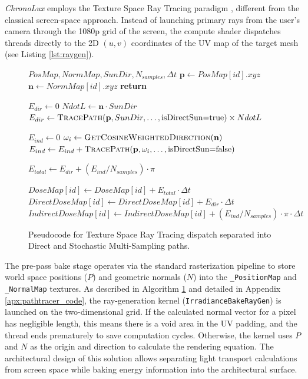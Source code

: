 \textit{ChronoLux} employs the Texture Space Ray Tracing paradigm \cite{hasselgren2016texture}, different from the classical screen-space approach. Instead of launching primary rays from the user’s camera through the 1080p grid of the screen, the compute shader dispatches threads directly to the 2D $(u, v)$ coordinates of the UV map of the target mesh (see Listing \ref{lst:raygen}).

\begin{figure}[H]
    \begin{algorithmic}
        \Require $PosMap, NormMap, SunDir, N_{samples}, \Delta t$
        \State $\mathbf{p} \leftarrow PosMap[id].xyz$
        \State $\mathbf{n} \leftarrow NormMap[id].xyz$
        \State \textbf{return} \quad {}
        \EndIf

        \State $E_{dir} \leftarrow 0$
        \State $NdotL \leftarrow \mathbf{n} \cdot SunDir$
        \State $E_{dir} \leftarrow \textsc{TracePath}(\mathbf{p}, SunDir, \dots, \text{isDirectSun=true}) \times NdotL$
        \EndIf

        \State $E_{ind} \leftarrow 0$
        \State $\omega_i \leftarrow \textsc{GetCosineWeightedDirection}(\mathbf{n})$
        \State $E_{ind} \leftarrow E_{ind} + \textsc{TracePath}(\mathbf{p}, \omega_i, \dots, \text{isDirectSun=false})$
        \EndFor

        \State $E_{total} \leftarrow E_{dir} + (E_{ind} / N_{samples}) \cdot \pi$

        \State $DoseMap[id] \leftarrow DoseMap[id] + E_{total} \cdot \Delta t$
        \State $DirectDoseMap[id] \leftarrow DirectDoseMap[id] + E_{dir} \cdot \Delta t$
        \State $IndirectDoseMap[id] \leftarrow IndirectDoseMap[id] + (E_{ind} / N_{samples}) \cdot \pi \cdot \Delta t$
        \EndFor
    \end{algorithmic}
    \caption{Pseudocode for Texture Space Ray Tracing dispatch separated into Direct and Stochastic Multi-Sampling paths.}
    \label{alg:ts_raytrace}
\end{figure}

The pre-pass bake stage operates via the standard rasterization pipeline to store world space positions ($P$) and geometric normals ($N$) into the \texttt{\_PositionMap} and \texttt{\_NormalMap} textures. As described in Algorithm \ref{alg:ts_raytrace} and detailed in Appendix \ref{apx:pathtracer_code}, the ray-generation kernel (\texttt{IrradianceBakeRayGen}) is launched on the two-dimensional grid. If the calculated normal vector for a pixel has negligible length, this means there is a void area in the UV padding, and the thread ends prematurely to save computation cycles. Otherwise, the kernel uses $P$ and $N$ as the origin and direction to calculate the rendering equation. The architectural design of this solution allows separating light transport calculations from screen space while baking energy information into the architectural surface.

